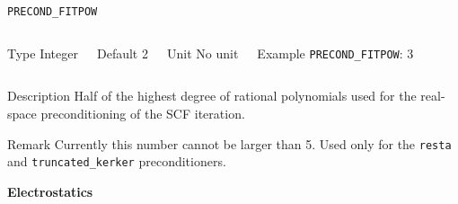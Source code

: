 \documentclass[xcolor=dvipsnames,t]{beamer}
\begin{document}
\begin{frame}[allowframebreaks]{\texttt{PRECOND\_FITPOW}} \label{PRECOND_FITPOW}
\vspace*{-12pt}
\begin{columns}
\begin{block}{Type}
Integer
\end{block}

\begin{block}{Default}
2
\end{block}

\begin{block}{Unit}
No unit
\end{block}

\begin{block}{Example}
\texttt{PRECOND\_FITPOW}: 3
\end{block}
\end{columns}

\begin{block}{Description}
Half of the highest degree of rational polynomials used for the real-space preconditioning of the SCF iteration. 
\end{block}

\begin{block}{Remark}
Currently this number cannot be larger than 5. Used only for the \texttt{resta} and \texttt{truncated\_kerker} preconditioners.
\end{block}

\end{frame}


\begin{frame}[allowframebreaks,c]{} \label{Electrostatics}

\begin{center}
\Huge \textbf{Electrostatics}
\end{center}

\end{frame}
\end{document}
